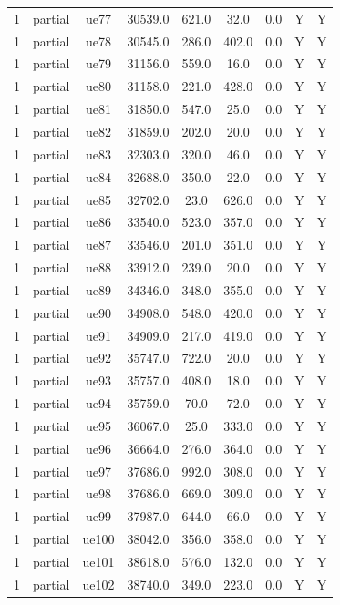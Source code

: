 \begin{table}[ht]
\begin{tabular}{|c|c|c|c|c|c|c|c|c|}
1 & partial & ue77 & 30539.0 & 621.0 & 32.0 & 0.0 & Y & Y \\
1 & partial & ue78 & 30545.0 & 286.0 & 402.0 & 0.0 & Y & Y \\
1 & partial & ue79 & 31156.0 & 559.0 & 16.0 & 0.0 & Y & Y \\
1 & partial & ue80 & 31158.0 & 221.0 & 428.0 & 0.0 & Y & Y \\
1 & partial & ue81 & 31850.0 & 547.0 & 25.0 & 0.0 & Y & Y \\
1 & partial & ue82 & 31859.0 & 202.0 & 20.0 & 0.0 & Y & Y \\
1 & partial & ue83 & 32303.0 & 320.0 & 46.0 & 0.0 & Y & Y \\
1 & partial & ue84 & 32688.0 & 350.0 & 22.0 & 0.0 & Y & Y \\
1 & partial & ue85 & 32702.0 & 23.0 & 626.0 & 0.0 & Y & Y \\
1 & partial & ue86 & 33540.0 & 523.0 & 357.0 & 0.0 & Y & Y \\
1 & partial & ue87 & 33546.0 & 201.0 & 351.0 & 0.0 & Y & Y \\
1 & partial & ue88 & 33912.0 & 239.0 & 20.0 & 0.0 & Y & Y \\
1 & partial & ue89 & 34346.0 & 348.0 & 355.0 & 0.0 & Y & Y \\
1 & partial & ue90 & 34908.0 & 548.0 & 420.0 & 0.0 & Y & Y \\
1 & partial & ue91 & 34909.0 & 217.0 & 419.0 & 0.0 & Y & Y \\
1 & partial & ue92 & 35747.0 & 722.0 & 20.0 & 0.0 & Y & Y \\
1 & partial & ue93 & 35757.0 & 408.0 & 18.0 & 0.0 & Y & Y \\
1 & partial & ue94 & 35759.0 & 70.0 & 72.0 & 0.0 & Y & Y \\
1 & partial & ue95 & 36067.0 & 25.0 & 333.0 & 0.0 & Y & Y \\
1 & partial & ue96 & 36664.0 & 276.0 & 364.0 & 0.0 & Y & Y \\
1 & partial & ue97 & 37686.0 & 992.0 & 308.0 & 0.0 & Y & Y \\
1 & partial & ue98 & 37686.0 & 669.0 & 309.0 & 0.0 & Y & Y \\
1 & partial & ue99 & 37987.0 & 644.0 & 66.0 & 0.0 & Y & Y \\
1 & partial & ue100 & 38042.0 & 356.0 & 358.0 & 0.0 & Y & Y \\
1 & partial & ue101 & 38618.0 & 576.0 & 132.0 & 0.0 & Y & Y \\
1 & partial & ue102 & 38740.0 & 349.0 & 223.0 & 0.0 & Y & Y \\

\end{tabular}
\end{table}

